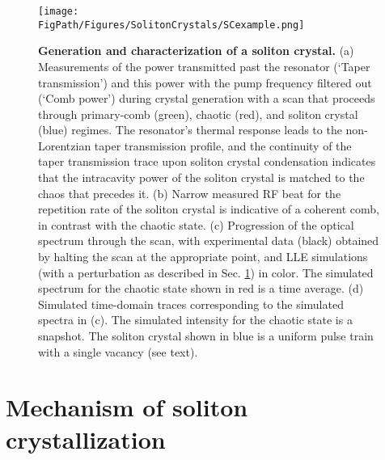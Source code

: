 \begin{figure}[htpb]
	\begin{center}
		\texttt{[image: \\FigPath/Figures/SolitonCrystals/SCexample.png]}
	\end{center}
	\caption[Generation and characterization of a soliton crystal]{\textbf{Generation and characterization of a soliton crystal.} (a) Measurements of the power transmitted past the resonator (`Taper transmission') and this power with the pump frequency filtered out (`Comb power') during crystal generation with a scan that proceeds through primary-comb (green), chaotic (red), and soliton crystal (blue) regimes. The resonator's thermal response leads to the non-Lorentzian taper transmission profile, and the continuity of the taper transmission trace upon soliton crystal condensation indicates that the intracavity power of the soliton crystal is matched to the chaos that precedes it. (b) Narrow measured RF beat for the repetition rate of the soliton crystal is indicative of a coherent comb, in contrast with the chaotic state. (c) Progression of the optical spectrum through the scan, with experimental data (black) obtained by halting the scan at the appropriate point, and LLE simulations (with a perturbation as described in Sec. \ref{sec:crystallizationmechanism}) in color. The simulated spectrum for the chaotic state shown in red is a time average. (d) Simulated time-domain traces corresponding to the simulated spectra in (c). The simulated intensity for the chaotic state is a snapshot. The soliton crystal shown in blue is a uniform pulse train with a single vacancy (see text).}
	\label{fig:SCexample}
\end{figure} 

\section{Mechanism of soliton crystallization} \label{sec:crystallizationmechanism}

